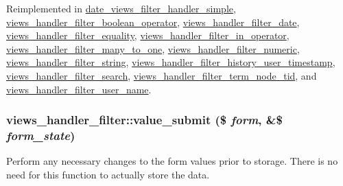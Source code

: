 Reimplemented in \hyperlink{classdate__views__filter__handler__simple_a59232ef0a63cc9cf0a4a702ea6b06f12}{date\_\-views\_\-filter\_\-handler\_\-simple}, \hyperlink{classviews__handler__filter__boolean__operator_a1680256640c960fef88ad1485cfb91f7}{views\_\-handler\_\-filter\_\-boolean\_\-operator}, \hyperlink{classviews__handler__filter__date_a5c7fb298feef092a2cb3bc3f75f54f29}{views\_\-handler\_\-filter\_\-date}, \hyperlink{classviews__handler__filter__equality_a5ef4270bd7b8fae32e024f6ca6e7a6b8}{views\_\-handler\_\-filter\_\-equality}, \hyperlink{classviews__handler__filter__in__operator_a6736083657cad0f8c7299b000f2b8e60}{views\_\-handler\_\-filter\_\-in\_\-operator}, \hyperlink{classviews__handler__filter__many__to__one_a6c5e3bbabc2ed73418f835195c10f451}{views\_\-handler\_\-filter\_\-many\_\-to\_\-one}, \hyperlink{classviews__handler__filter__numeric_ab0888218590f7c620f10fc04a98d135e}{views\_\-handler\_\-filter\_\-numeric}, \hyperlink{classviews__handler__filter__string_a41c2ed02d24685d046eccd9e751ad916}{views\_\-handler\_\-filter\_\-string}, \hyperlink{classviews__handler__filter__history__user__timestamp_a38401d36304bef8a19184a8e7919427f}{views\_\-handler\_\-filter\_\-history\_\-user\_\-timestamp}, \hyperlink{classviews__handler__filter__search_a60e1cc17477e80f07c703ae29348b329}{views\_\-handler\_\-filter\_\-search}, \hyperlink{classviews__handler__filter__term__node__tid_a3259d8a91cb0c13c51c02942b267b131}{views\_\-handler\_\-filter\_\-term\_\-node\_\-tid}, and \hyperlink{classviews__handler__filter__user__name_a08bc953c1682728eb0d38e5592a3286e}{views\_\-handler\_\-filter\_\-user\_\-name}.\hypertarget{classviews__handler__filter_ae71b3b09b75932ec6a8db33d56d41035}{
\subsubsection[{value\_\-submit}]{\setlength{\rightskip}{0pt plus 5cm}views\_\-handler\_\-filter::value\_\-submit (\$ {\em form}, \/  \&\$ {\em form\_\-state})}}
\label{classviews__handler__filter_ae71b3b09b75932ec6a8db33d56d41035}
Perform any necessary changes to the form values prior to storage. There is no need for this function to actually store the data. 

